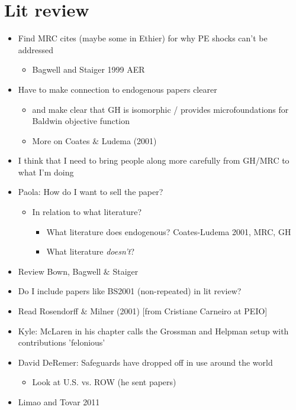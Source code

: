 \documentclass[12pt]{article}
\begin{document}
\section{Lit review}
\begin{itemize}
	\item Find MRC cites (maybe some in Ethier) for why PE shocks can't be addressed
		\begin{itemize}
			\item Bagwell and Staiger 1999 AER
		\end{itemize}
	\item Have to make connection to endogenous papers clearer
		\begin{itemize}
			\item and make clear that GH is isomorphic / provides microfoundations for Baldwin objective function
			\item More on Coates $\&$ Ludema (2001)
		\end{itemize}
	\item I think that I need to bring people along more carefully from GH/MRC to what I'm doing
	\item Paola: How do I want to sell the paper?
		\begin{itemize}
			\item In relation to what literature?
				\begin{itemize}
					\item What literature does endogenous? Coates-Ludema 2001, MRC, GH
					\item What literature \textit{doesn't}?
				\end{itemize}
			\end{itemize}
	\item Review Bown, Bagwell $\&$ Staiger
	\item Do I include papers like BS2001 (non-repeated) in lit review?
	\item Read Rosendorff $\&$ Milner (2001) [from Cristiane Carneiro at PEIO]
	\item Kyle: McLaren in his chapter calls the Grossman and Helpman setup with
	 contributions 'felonious'
	\item David DeRemer: Safeguards have dropped off in use around the world
		\begin{itemize}
			\item Look at U.S. vs. ROW (he sent papers)
		\end{itemize}
	\item Limao and Tovar 2011
		\begin{enumerate}

\end{enumerate}
\end{itemize}
\end{document}
